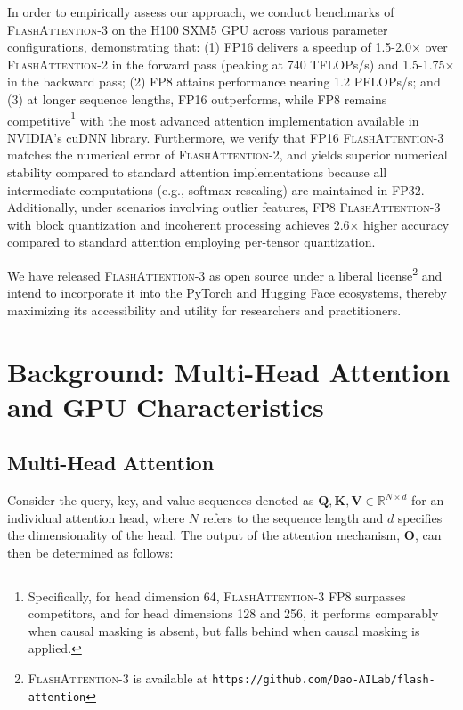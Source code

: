 In order to empirically assess our approach, we conduct benchmarks of \textsc{FlashAttention-3} on the H100 SXM5 GPU across various parameter configurations, demonstrating that: (1) FP16 delivers a speedup of 1.5-2.0$\times$ over \textsc{FlashAttention-2} in the forward pass (peaking at 740 TFLOPs/s) and 1.5-1.75$\times$ in the backward pass; (2) FP8 attains performance nearing 1.2 PFLOPs/s; and (3) at longer sequence lengths, FP16 outperforms, while FP8 remains competitive\footnote{Specifically, for head dimension 64, \textsc{FlashAttention-3} FP8 surpasses competitors, and for head dimensions 128 and 256, it performs comparably when causal masking is absent, but falls behind when causal masking is applied.} with the most advanced attention implementation available in NVIDIA’s cuDNN library. Furthermore, we verify that FP16 \textsc{FlashAttention-3} matches the numerical error of \textsc{FlashAttention-2}, and yields superior numerical stability compared to standard attention implementations because all intermediate computations (e.g., softmax rescaling) are maintained in FP32. Additionally, under scenarios involving outlier features, FP8 \textsc{FlashAttention-3} with block quantization and incoherent processing achieves 2.6$\times$ higher accuracy compared to standard attention employing per-tensor quantization.

We have released \textsc{FlashAttention-3} as open source under a liberal license\footnote{\textsc{FlashAttention-3} is available at \texttt{https://github.com/Dao-AILab/flash-attention}} and intend to incorporate it into the PyTorch and Hugging Face ecosystems, thereby maximizing its accessibility and utility for researchers and practitioners.

\section{Background: Multi-Head Attention and GPU Characteristics}
\label{sec:background}

\subsection{Multi-Head Attention}
\label{subsec:multi_head_attn}

Consider the query, key, and value sequences denoted as $\mathbf{Q}, \mathbf{K}, \mathbf{V} \in \mathbb{R}^{N \times d}$ for an individual attention head, where $N$ refers to the sequence length and $d$ specifies the dimensionality of the head. The output of the attention mechanism, $\mathbf{O}$, can then be determined as follows:

